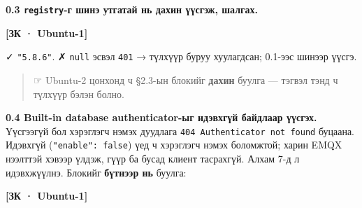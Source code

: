 \textbf{0.3 \texttt{registry}-г шинэ утгатай нь дахин үүсгэж, шалгах.}

\textbf{{[}ЗК · Ubuntu-1{]}}

\begin{Shaded}
\begin{Highlighting}[]
  \KeywordTok{|} \VariableTok{)}
  \KeywordTok{|} \VariableTok{)}
\StringTok{:}\KeywordTok{|}  
\end{Highlighting}
\end{Shaded}

✓ \texttt{"5.8.6"}. ✗ \texttt{null} эсвэл \texttt{401} → түлхүүр буруу хуулагдсан; 0.1-ээс шинээр үүсгэ.

\begin{quote}
☞ Ubuntu-2 цонхонд ч §2.3-ын блокийг \textbf{дахин} буулга --- тэгвэл тэнд ч түлхүүр бэлэн болно.
\end{quote}

\textbf{0.4 Built-in database authenticator-ыг идэвхгүй байдлаар үүсгэх.} Үүсгээгүй бол хэрэглэгч нэмэх дуудлага \texttt{404\ Authenticator\ not\ found} буцаана. Идэвхгүй (\texttt{"enable":\ false}) үед ч хэрэглэгч нэмэх боломжтой; харин EMQX нээлттэй хэвээр үлдэж, гүүр ба бусад клиент тасрахгүй. Алхам 7-д л идэвхжүүлнэ. Блокийг \textbf{бүтнээр нь} буулга:

\textbf{{[}ЗК · Ubuntu-1{]}}

\begin{Shaded}
\begin{Highlighting}[]
\StringTok{:}\KeywordTok{\textbackslash{}}
    \KeywordTok{\textbackslash{}}
   
 \KeywordTok{|}  
\end{Highlighting}
\end{Shaded}

